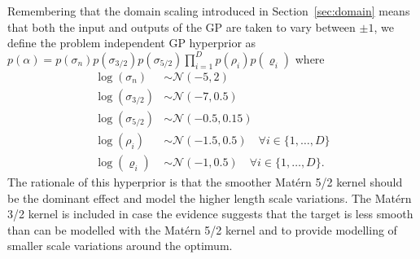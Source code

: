 
Remembering that the domain scaling introduced in Section~\ref{sec:domain} means that both the input and outputs of the GP are taken to vary between $\pm1$, we define the problem independent GP hyperprior as $p(\alpha)=p(\sigma_n)p(\sigma_{3/2})p(\sigma_{5/2})\prod_{i=1}^{D}p(\rho_i)p(\varrho_i)$ where
\begin{subequations}
	\begin{align}
	\label{eq:hyperPriorDef}
	\log \left(\sigma_n\right) & \sim \mathcal{N} \left(-5,2\right) \\
	\log\left(\sigma_{3/2}\right) & \sim \mathcal{N} \left(-7,0.5\right)\\
	\log\left(\sigma_{5/2}\right) & \sim \mathcal{N} \left(-0.5,0.15\right)\\
	\log \left(\rho_i\right) & \sim \mathcal{N} (-1.5,0.5) \quad \forall i \in \{1,\dots,D\}\\
	\log\left(\varrho_i\right) & \sim \mathcal{N} \left(-1,0.5\right) \quad \forall i \in \{1,\dots,D\}.
	\end{align}
\end{subequations}
The rationale of this hyperprior is that the smoother Mat\'{e}rn 5/2 kernel should be the dominant effect and model the higher length scale variations. The Mat\'{e}rn 3/2 kernel is included in case the evidence suggests that the target is less smooth than can be modelled with the Mat\'{e}rn 5/2 kernel and to provide modelling of smaller scale variations around the optimum.